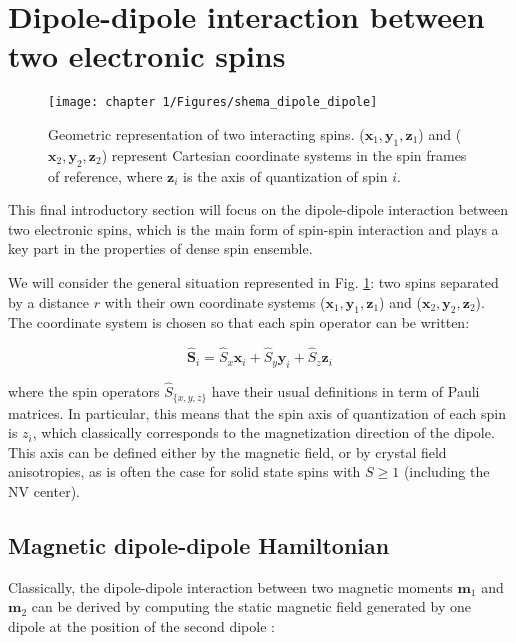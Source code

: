 \documentclass[a4paper, 11pt]{book}
\begin{document}
\section{Dipole-dipole interaction between two electronic spins}

\begin{figure}[h!]
\centering
\texttt{[image: chapter 1/Figures/shema\_dipole\_dipole]}
\caption{Geometric representation of two interacting spins. ($\mathbf{x}_1,\mathbf{y}_1,\mathbf{z}_1$) and ($\mathbf{x}_2,\mathbf{y}_2,\mathbf{z}_2$) represent Cartesian coordinate systems in the spin frames of reference, where $\mathbf{z}_i$ is the axis of quantization of spin $i$.} 
\label{dipole-dipole}
\end{figure}

This final introductory section will focus on the dipole-dipole interaction between two electronic spins, which is the main form of spin-spin interaction and plays a key part in the properties of dense spin ensemble. 

We will consider the general situation represented in Fig. \ref{dipole-dipole}: two spins separated by a distance $r$ with their own coordinate systems ($\mathbf{x}_1,\mathbf{y}_1,\mathbf{z}_1$) and ($\mathbf{x}_2,\mathbf{y}_2,\mathbf{z}_2$). The coordinate system is chosen so that each spin operator can be written:

\begin{equation}
\hat{\mathbf{S}}_i=\hat{S}_x \mathbf{x}_i + \hat{S}_y \mathbf{y}_i + \hat{S}_z \mathbf{z}_i
\end{equation}

where the spin operators $\hat S_{\{x,y,z\} }$ have their usual definitions in term of Pauli matrices. In particular, this means that the spin axis of quantization of each spin is $z_i$, which classically corresponds to the magnetization direction of the dipole. This axis can be defined either by the magnetic field, or by crystal field anisotropies, as is often the case for solid state spins with $S\geq 1$ (including the NV center).

\subsection{Magnetic dipole-dipole Hamiltonian}

Classically, the dipole-dipole interaction between two magnetic moments $\mathbf{m}_1$ and $\mathbf{m}_2$ can be derived by computing the static magnetic field generated by one dipole at the position of the second dipole \cite[p.~188]{jackson1999classical}:
\end{document}
